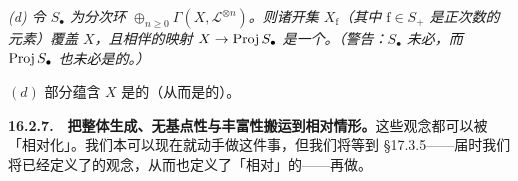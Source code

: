 \emph{(d) 令 $S_\bullet$ 为分次环 $\oplus_{n\ge 0}\Gamma(X,\mathscr{L}^{\otimes n})$。则诸开集 $X_{\mathrm{f}}$（其中 $\mathrm{f}\in S_+$ 是正次数的\trHomogeneous{}元素）覆盖 $X$，且相伴的映射 $X\to\operatorname{Proj} S_\bullet$ 是一个\trOpenEmbedding。（警告：$S_\bullet$ 未必\trFinitelyGenerated，而 $\operatorname{Proj} S_\bullet$ 也未必是\trFiniteType{}的。）}

$(d)$ 部分蕴含 $X$ 是\trSeparated{}的（从而是\trQuasiSeparated{}的）。

\textbf{16.2.7.}\ \hard\ \textbf{把整体生成、无基点性与丰富性搬运到相对情形。}\quad 这些观念都可以被「相对化」。我们本可以现在就动手做这件事，但我们将等到 \S17.3.5——届时我们将已经定义了\trProjective\trMorphism{}的观念，从而也定义了「相对\trVeryAmple」的\trLineBundle——再做。
